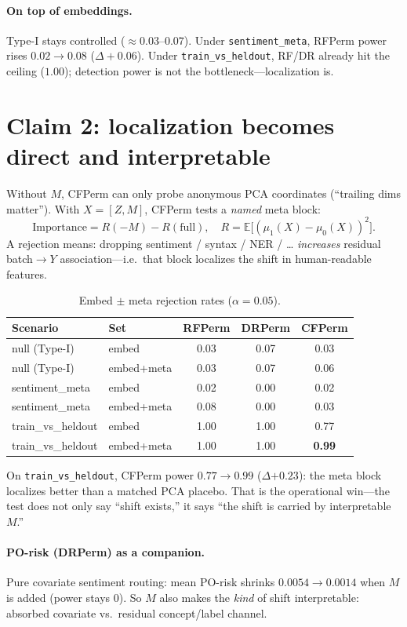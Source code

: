 \documentclass[11pt]{article}
\begin{document}
\paragraph{On top of embeddings.}
Type-I stays controlled ($\approx 0.03$--$0.07$).
Under \texttt{sentiment\_meta}, RFPerm power rises $0.02\to 0.08$ ($\Delta{+}0.06$).
Under \texttt{train\_vs\_heldout}, RF/DR already hit the ceiling ($1.00$);
detection power is not the bottleneck---localization is.

\section{Claim 2: localization becomes direct and interpretable}
Without $M$, CFPerm can only probe anonymous PCA coordinates
(``trailing dims matter'').
With $X=[Z,M]$, CFPerm tests a \emph{named} meta block:
\[
\mathrm{Importance}
  = R(-M)-R(\mathrm{full}),\quad
  R=\mathbb{E}\bigl[(\mu_1(X)-\mu_0(X))^2\bigr].
\]
A rejection means: dropping sentiment / syntax / NER / \ldots
\emph{increases} residual batch$\to Y$ association---i.e.\ that block
localizes the shift in human-readable features.

\begin{table}[h]
\centering
\caption{Embed $\pm$ meta rejection rates ($\alpha{=}0.05$).}
\begin{tabular}{llccc}
\toprule
Scenario & Set & RFPerm & DRPerm & CFPerm \\
\midrule
null (Type-I) & embed & 0.03 & 0.07 & 0.03 \\
null (Type-I) & embed+meta & 0.03 & 0.07 & 0.06 \\
sentiment\_meta & embed & 0.02 & 0.00 & 0.02 \\
sentiment\_meta & embed+meta & 0.08 & 0.00 & 0.03 \\
train\_vs\_heldout & embed & 1.00 & 1.00 & 0.77 \\
train\_vs\_heldout & embed+meta & 1.00 & 1.00 & \textbf{0.99} \\
\bottomrule
\end{tabular}
\end{table}

\noindent
On \texttt{train\_vs\_heldout}, CFPerm power
$0.77\to\mathbf{0.99}$ ($\Delta\mathbf{+0.23}$):
the meta block localizes better than a matched PCA placebo.
That is the operational win---the test does not only say
``shift exists,'' it says ``the shift is carried by interpretable $M$.''

\paragraph{PO-risk (DRPerm) as a companion.}
Pure covariate sentiment routing: mean PO-risk shrinks
$0.0054\to 0.0014$ when $M$ is added (power stays $0$).
So $M$ also makes the \emph{kind} of shift interpretable:
absorbed covariate vs.\ residual concept/label channel.
\end{document}
